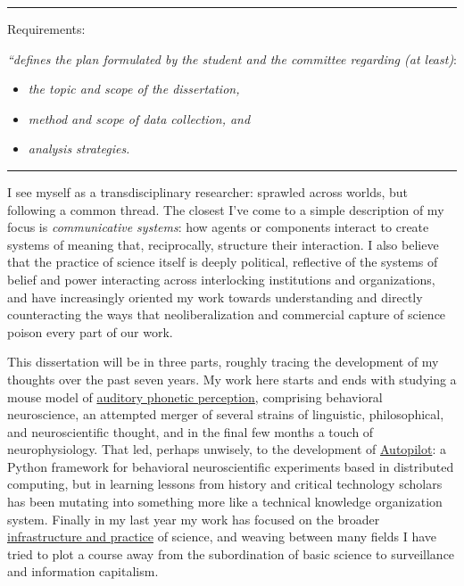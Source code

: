 
\hrule
\vspace{1em}

Requirements: 

\textit{``defines the plan formulated by the student and the committee regarding (at least)}:

\begin{itemize}
\item \textit{the topic and scope of the dissertation,}
\item \textit{method and scope of data collection, and}
\item \textit{analysis strategies.}
\end{itemize}

\vspace{1em}
\hrule
\vspace{2em}

I see myself as a transdisciplinary researcher: sprawled across worlds, but following a common thread. The closest I've come to a simple description of my focus is \textit{communicative systems}: how agents or components interact to create systems of meaning that, reciprocally, structure their interaction. I also believe that the practice of science itself is deeply political, reflective of the systems of belief and power interacting across interlocking institutions and organizations, and have increasingly oriented my work towards understanding and directly counteracting the ways that neoliberalization and commercial capture of science poison every part of our work.

This dissertation will be in three parts, roughly tracing the development of my thoughts over the past seven years. My work here starts and ends with studying a mouse model of \hyperref[sec:phonemes]{auditory phonetic perception}, comprising behavioral neuroscience, an attempted merger of several strains of linguistic, philosophical, and neuroscientific thought, and in the final few months a touch of neurophysiology. That led, perhaps unwisely, to the development of \hyperref[sec:autopilot]{Autopilot}: a Python framework for behavioral neuroscientific experiments based in distributed computing, but in learning lessons from history and critical technology scholars has been mutating into something more like a technical knowledge organization system. Finally in my last year my work has focused on the broader \hyperref[sec:infrastructure]{infrastructure and practice} of science, and weaving between many fields I have tried to plot a course away from the subordination of basic science to surveillance and information capitalism. 

